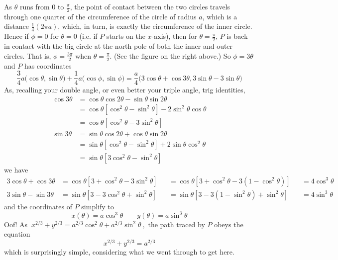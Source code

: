 As $\theta$ runs from 0 to $\frac{\pi}{2}$, the point of contact
between the two circles travels through one quarter of the circumference
of the circle of radius $a$, which is a distance $\frac{1}{4}(2\pi a)$, 
which, in turn, is exactly the circumference of the inner circle. 
Hence if $\phi=0$ for $\theta=0$ (i.e. if $P$ starts on the $x$-axis), 
then for $\theta=\frac{\pi}{2}$, $P$ is back in contact with the big 
circle at the north pole of both the inner and outer circles. 
That is, $\phi=\frac{3\pi}{2}$ when $\theta=\frac{\pi}{2}$. 
(See the figure on the right above.) 
So $\phi=3\theta$  and $P$ has coordinates
\begin{equation*}
\frac{3}{4}a\big(\cos\theta,\sin\theta\big)
+\frac{1}{4}a\big(\cos\phi,\sin\phi\big)
=\frac{a}{4}\big(3\cos\theta+\cos 3\theta,3\sin\theta-3\sin\theta\big)
\end{equation*}
As, recalling your double angle, or even better your triple angle, 
trig identities,
\begin{align*}
\cos3\theta&=\cos\theta\cos2\theta-\sin\theta\sin 2\theta\\
&=\cos\theta[\cos^2\theta-\sin^2\theta]-2\sin^2\theta\cos\theta\\
&=\cos\theta[\cos^2\theta-3\sin^2\theta]\\
\sin3\theta&=\sin\theta\cos2\theta+\cos\theta\sin 2\theta\\
&=\sin\theta[\cos^2\theta-\sin^2\theta]+2\sin\theta\cos^2\theta\\
&=\sin\theta[3\cos^2\theta-\sin^2\theta]
\end{align*}
we have
\begin{equation*}
\begin{alignedat}{3}
3\cos\theta+\cos 3\theta
   &=\cos\theta[3+\cos^2\theta-3\sin^2\theta] &
   &=\cos\theta[3+\cos^2\theta-3(1-\cos^2\theta)] &
   &=4\cos^3\theta\\
3\sin\theta-\sin 3\theta
   &=\sin\theta[3-3\cos^2\theta+\sin^2\theta] &
   &=\sin\theta[3-3(1-\sin^2\theta)+\sin^2\theta] &
   &=4\sin^3\theta
\end{alignedat}
\end{equation*}
and the coordinates of $P$ simplify to
\begin{equation*}
x(\theta)= a\cos^3\theta\qquad y(\theta)=a\sin^3\theta
\end{equation*}
Oof! As
$\ 
x^{2/3}+y^{2/3}=a^{2/3}\cos^2\theta+a^{2/3}\sin^2\theta 
\ ,$
the path traced by $P$ obeys the equation
\begin{equation*}
x^{2/3}+y^{2/3} =a^{2/3}
\end{equation*}
which is surprisingly simple, considering what we went through to get here.

